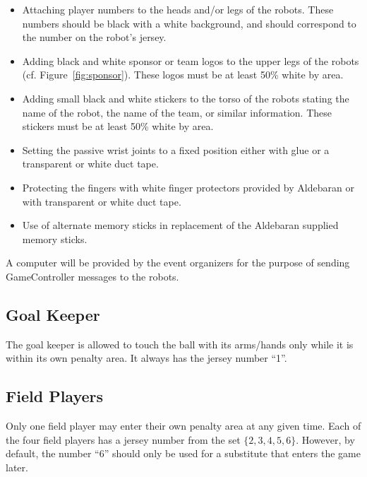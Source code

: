 \documentclass[12pt]{article}
\newcommand{\cf}{\mbox{cf.}\xspace}
\begin{document}
\begin{itemize}

\item Attaching player numbers to the heads and/or legs of the robots.  These numbers should be black with a white background, and should correspond to the number on the robot's jersey.

\item Adding black and white sponsor or team logos to the upper legs of the robots (\cf Figure~\ref{fig:sponsor}). These logos must be at least 50\% white by area.

\item Adding small black and white stickers to the torso of the robots stating the name of the robot, the name of the team, or similar information. These stickers must be at least 50\% white by area.

\item Setting the passive wrist joints to a fixed position either with glue or a transparent or white duct tape.

\item Protecting the fingers with white finger protectors provided by Aldebaran or with transparent or white duct tape.

\item Use of alternate memory sticks in replacement of the Aldebaran supplied memory sticks.

\end{itemize}

A computer will be provided by the event organizers for the purpose of sending GameController messages to the robots.

\subsection{Goal Keeper}
\label{sec:goal_keeper}

The goal keeper is allowed to touch the ball with its arms/hands only while it is within its own penalty area. It always has the jersey number ``1''.

\subsection{Field Players}
\label{sec:field_players}
Only one field player may enter their own penalty area at any given time. Each of the four field players has a jersey number from the set $\{2, 3, 4, 5, 6\}$. However, by default, the number ``6'' should only be used for a substitute that enters the game later.
\end{document}
